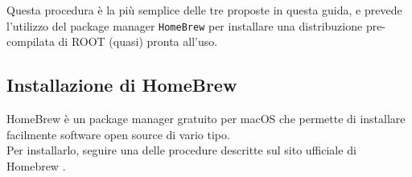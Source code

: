 Questa procedura è la più semplice delle tre proposte in questa guida, e prevede l'utilizzo del package manager \texttt{HomeBrew} per installare una distribuzione pre-compilata di ROOT (quasi) pronta all'uso.\\

\subsection{Installazione di HomeBrew}
\label{brew-install}
HomeBrew è un package manager gratuito per macOS che permette di installare facilmente software open source di vario tipo. \\
Per installarlo, seguire una delle procedure descritte sul sito ufficiale di Homebrew \cite{brew_page}.\\